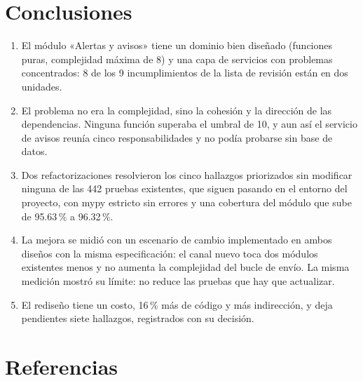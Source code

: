 \documentclass[11pt,a4paper]{article}
\begin{document}
\section{Conclusiones}

\begin{enumerate}
  \item El módulo «Alertas y avisos» tiene un dominio bien diseñado (funciones puras, complejidad máxima de 8) y una capa de servicios con problemas concentrados: 8 de los 9 incumplimientos de la lista de revisión están en dos unidades.
  \item El problema no era la complejidad, sino la cohesión y la dirección de las dependencias. Ninguna función superaba el umbral de 10, y aun así el servicio de avisos reunía cinco responsabilidades y no podía probarse sin base de datos.
  \item Dos refactorizaciones resolvieron los cinco hallazgos priorizados sin modificar ninguna de las 442 pruebas existentes, que siguen pasando en el entorno del proyecto, con mypy estricto sin errores y una cobertura del módulo que sube de 95.63\,\% a 96.32\,\%.
  \item La mejora se midió con un escenario de cambio implementado en ambos diseños con la misma especificación: el canal nuevo toca dos módulos existentes menos y no aumenta la complejidad del bucle de envío. La misma medición mostró su límite: no reduce las pruebas que hay que actualizar.
  \item El rediseño tiene un costo, 16\,\% más de código y más indirección, y deja pendientes siete hallazgos, registrados con su decisión.
\end{enumerate}

\section*{Referencias}
\end{document}
